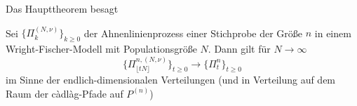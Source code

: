 Das Haupttheorem besagt
\begin{theorem}
    Sei $\{ \Pi_k^{(N,\nu)}\}_{k \geq 0}$ der Ahnenlinienprozess einer Stichprobe der Größe $n$ in einem Wright-Fischer-Modell mit Populationsgröße $N$. Dann gilt für $N \to \infty$
\[
    \{ \Pi^{n,(N,\nu)}_{\lfloor tN\rfloor}\}_{t \geq 0} \to \{\Pi^n_t\}_{t \geq 0}
\]
im Sinne der endlich-dimensionalen Verteilungen (und in Verteilung auf dem Raum der càdlàg-Pfade auf $P^{(n)}$)
\end{theorem}
